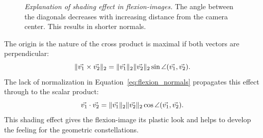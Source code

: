 \begin{figure}[H]
    
    \caption[Explanation of shading effect in \glspl{flexion-image}]{\emph{Explanation of shading effect in \glspl{flexion-image}.} The angle between the diagonals decreases with increasing distance from the camera center. This results in shorter normals.}\label{fig:flexion_angle_decrease}
\end{figure}
The origin is the nature of the cross product is maximal if both vectors are perpendicular:
\begin{equation*}
    \lVert\vec{v_1} \times \vec{v_2}\rVert_{2} = \lVert\vec{v_1}\rVert_{2} \lVert\vec{v_2}\rVert_{2} \sin \angle(\vec{v_1}, \vec{v_2})\text{.}
\end{equation*}
The lack of normalization in Equation~\ref{eq:flexion_normals} propagates this effect through to the scalar product:
\begin{equation*}
    \vec{v_1} \cdot \vec{v_2} = \lVert\vec{v_1}\rVert_{2} \lVert\vec{v_2}\rVert_{2} \cos \angle(\vec{v_1}, \vec{v_2})\text{.}
\end{equation*}
This shading effect gives the \gls{flexion-image} its plastic look and helps to develop the feeling for the geometric constellations.
